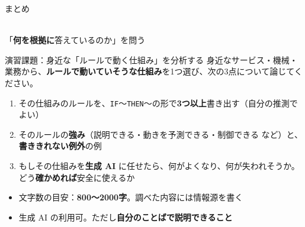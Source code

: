 \documentclass[aspectratio=169]{beamer}
\begin{document}
\begin{frame}{まとめ}
\begin{center}
\\[0.8em]
{\large 「\textbf{何を根拠に}答えているのか」を問う}
\end{center}
\end{frame}

\begin{frame}{演習課題：身近な「ルールで動く仕組み」を分析する}
身近なサービス・機械・業務から、\textbf{ルールで動いていそうな仕組み}を1つ選び、次の3点について論じてください。
\begin{enumerate}
  \item その仕組みのルールを、\texttt{IF}〜\texttt{THEN}〜の形で\textbf{3つ以上}書き出す（自分の推測でよい）
  \item そのルールの\textbf{強み}（説明できる・動きを予測できる・制御できる など）と、\textbf{書ききれない例外}の例
  \item もしその仕組みを\textbf{生成 AI} に任せたら、何がよくなり、何が失われそうか。どう\textbf{確かめれば}安全に使えるか
\end{enumerate}
\vspace{0.2em}
\begin{itemize}\small
  \item 文字数の目安：\textbf{800〜2000字}。調べた内容には情報源を書く
  \item 生成 AI の利用可。ただし\textbf{自分のことばで説明できること}
\end{itemize}
\end{frame}
\end{document}
